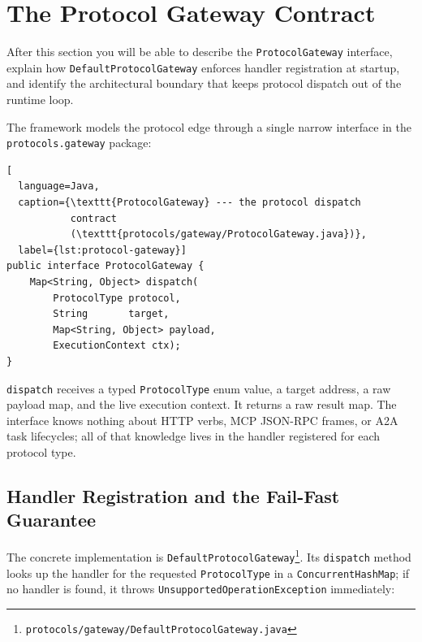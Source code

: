 \section{The Protocol Gateway Contract}
\label{sec:protocol-adapter}

\begin{learningbox}
After this section you will be able to describe the
\lstinline{ProtocolGateway} interface, explain how
\lstinline{DefaultProtocolGateway} enforces handler registration at
startup, and identify the architectural boundary that keeps
protocol dispatch out of the runtime loop.
\end{learningbox}

The framework models the protocol edge through a single narrow
interface in the \lstinline{protocols.gateway} package:

\begin{lstlisting}[
  language=Java,
  caption={\texttt{ProtocolGateway} --- the protocol dispatch
           contract
           (\texttt{protocols/gateway/ProtocolGateway.java})},
  label={lst:protocol-gateway}]
public interface ProtocolGateway {
    Map<String, Object> dispatch(
        ProtocolType protocol,
        String       target,
        Map<String, Object> payload,
        ExecutionContext ctx);
}
\end{lstlisting}

\lstinline{dispatch} receives a typed \lstinline{ProtocolType} enum
value, a target address, a raw payload map, and the live execution
context.  It returns a raw result map.  The interface knows nothing
about HTTP verbs, MCP JSON-RPC frames, or A2A task lifecycles; all
of that knowledge lives in the handler registered for each protocol
type.

\subsection{Handler Registration and the Fail-Fast Guarantee}
\label{subsec:handler-registration}

The concrete implementation is
\lstinline{DefaultProtocolGateway}\footnote{\texttt{protocols/gateway/DefaultProtocolGateway.java}}.
Its \lstinline{dispatch} method looks up the handler for the
requested \lstinline{ProtocolType} in a
\lstinline{ConcurrentHashMap}; if no handler is found, it throws
\lstinline{UnsupportedOperationException} immediately:

